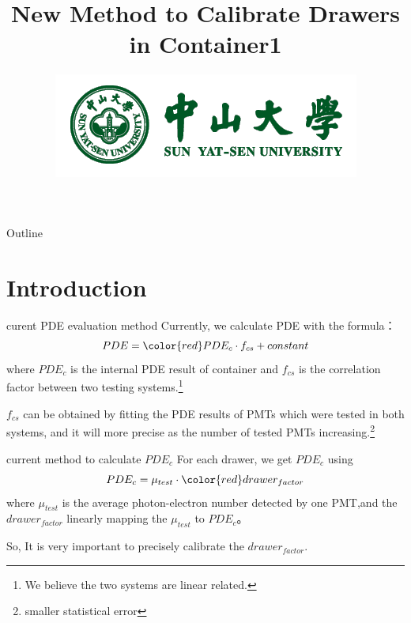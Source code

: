 \documentclass[11pt,compress,xcolor=x11names,UTF8]{beamer}
\title{New Method to Calibrate Drawers in Container1}
\author[Rong. Zhao]{Email：zhaor25@mail2.sysu.edu.cn \and  } %
\institute[SYSU]{School of Physics\and } %
\date[\today]{\includegraphics[width=.5\textwidth]{logo}}
\begin{document}
\maketitle

\begin{frame}{Outline}
\tableofcontents
\end{frame}

\section{Introduction}


\begin{frame}{curent PDE evaluation method}
Currently, we calculate PDE with the formula：
\begin{equation}
PDE={\color{red}PDE_c}\cdot f_{cs}+constant
\label{pde_cs}
\end{equation}
where  $PDE_c$ is the internal PDE result of container and  $f_{cs}$ is the correlation factor between two testing systems.\footnote{We believe the two systems are linear related.}
\vspace{.5cm}

$f_{cs}$ can be obtained by fitting the PDE results of PMTs which were tested in both systems, and it will more precise as the number of tested PMTs increasing.\footnote{smaller statistical error} 
\end{frame}
\begin{frame}{current method to calculate $PDE_{c}$}
For each drawer, we get $PDE_c$ using
\begin{equation}
PDE_c=\mu_{test}\cdot {\color{red}drawer_{factor}}
\label{pde_formula}
\end{equation}
where $\mu_{test}$ is the average photon-electron number detected by one PMT,and the $drawer_{factor}$ linearly mapping the $\mu_{test}$ to $PDE_c$。

\vspace{.5cm}
\alert{So, It is very important to precisely calibrate the $drawer_{factor}$. }
\end{frame}
\end{document}
